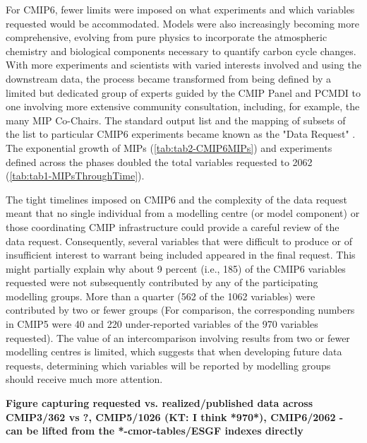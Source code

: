 \documentclass[gmd, preprint]{copernicus}
\def\cred#1{{\color{red}#1}}
\begin{document}
For CMIP6, fewer limits were imposed on what experiments and which variables requested would be accommodated. Models were also increasingly becoming more comprehensive, evolving from pure physics to incorporate the atmospheric chemistry and biological components necessary to quantify carbon cycle changes. With more experiments and scientists with varied interests involved and using the downstream data, the process became transformed from being defined by a limited but dedicated group of experts guided by the CMIP Panel and PCMDI to one involving more extensive community consultation, including, for example, the many MIP Co-Chairs. The standard output list and the mapping of subsets of the list to particular CMIP6 experiments became known as the "Data Request" \citep{juckes_cmip6_2020}. The exponential growth of MIPs (\autoref{tab:tab2-CMIP6MIPs}) and experiments defined across the phases doubled the total variables requested to 2062 (\autoref{tab:tab1-MIPsThroughTime}). 

The tight timelines imposed on CMIP6 and the complexity of the data request meant that no single individual from a modelling centre (or model component) or those coordinating CMIP infrastructure could provide a careful review of the data request. Consequently, several variables that were difficult to produce or of insufficient interest to warrant being included appeared in the final request. This might partially explain why about 9 percent (i.e., 185) of the CMIP6 variables requested were not subsequently contributed by any of the participating modelling groups. More than a quarter (562 of the 1062 variables) were contributed by two or fewer groups (For comparison, the corresponding numbers in CMIP5 were 40 and 220 under-reported variables of the 970 variables requested). The value of an intercomparison involving results from two or fewer modelling centres is limited, which suggests that when developing future data requests, determining which variables will be reported by modelling groups should receive much more attention. 

\cred{\textbf{Figure capturing requested vs. realized/published data across CMIP3/362 vs ?, CMIP5/1026 (KT: I think *970*), CMIP6/2062 - can be lifted from the *-cmor-tables/ESGF indexes directly}}
\end{document}
